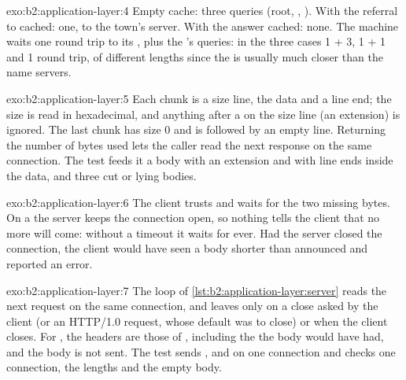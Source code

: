 \begin{solution}{exo:b2:application-layer:4}
Empty cache: three queries (root, , ). With the referral to 
cached: one, to the town's server. With the answer cached: none. The machine waits one round trip to its ,
plus the 's queries: in the three cases 1 + 3, 1 + 1 and 1 round trip, of different lengths since the
 is usually much closer than the name servers.
\end{solution}

\begin{solution}{exo:b2:application-layer:5}
Each chunk is a size line, the data and a line end; the size is read in hexadecimal, and anything after a \code{;} on
the size line (an extension) is ignored. The last chunk has size 0 and is followed by an empty line. Returning the
number of bytes used lets the caller read the next response on the same connection. The test feeds it a body with an
extension and with line ends inside the data, and three cut or lying bodies.
\end{solution}

\begin{solution}{exo:b2:application-layer:6}
The client trusts  and waits for the two missing bytes. On a  the server
keeps the connection open, so nothing tells the client that no more will come: without a timeout it waits for ever.
Had the server closed the connection, the client would have seen a body shorter than announced and reported an error.
\end{solution}

\begin{solution}{exo:b2:application-layer:7}
The loop of \cref{lst:b2:application-layer:server} reads the next request on the same connection, and leaves only on
a close asked by the client (or an HTTP/1.0 request, whose default was to close) or when the client closes. For
, the headers are those of , including the  the body would have had, and the
body is not sent. The test sends ,  and  on one connection and checks one connection,
the lengths and the empty body.
\end{solution}

